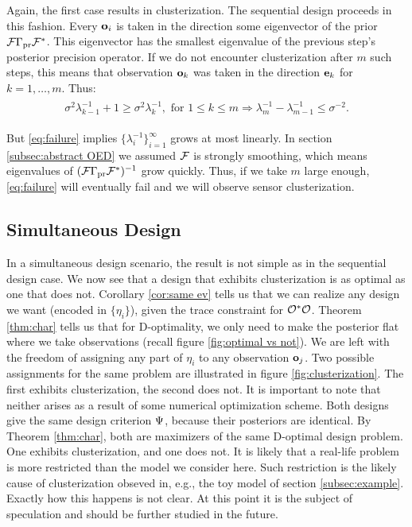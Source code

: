 \documentclass{amsart}
\numberwithin{equation}{section}
\begin{document}
Again, the first case results in clusterization. The sequential design
proceeds in this fashion. Every $\mathbf{o}_i$ is taken in the direction
some eigenvector of the prior $\mathcal{F} \Gamma_{\textup{pr}}\mathcal{F}^*$. This eigenvector
has the smallest eigenvalue of the previous step's posterior precision
operator. If we do not encounter clusterization after $m$ such steps,
this means that observation $\mathbf{o}_k$ was taken in the direction
$\mathbf{e}_k$ for $k=1,\dots,m$. Thus:
\begin{align}\label{eq:failure}
  \begin{split}
    \sigma^2\lambda_{k-1}^{-1} + 1 \geq \sigma^2\lambda_k^{-1}, \text{ for } 1\leq k \leq m
    \Longrightarrow \lambda_m^{-1} - \lambda_{m-1}^{-1} \leq \sigma^{-2}.
  \end{split}
\end{align}

But \eqref{eq:failure} implies $\{\lambda_i^{-1}\}_{i=1}^{\infty}$
grows at most linearly. In section \ref{subsec:abstract OED} we
assumed $\mathcal{F}$ is strongly smoothing, which means eigenvalues of
$(\mathcal{F} \Gamma_{\textup{pr}}\mathcal{F}^*)^{-1}$ grow quickly. Thus, if we take $m$ large
enough, \eqref{eq:failure} will eventually fail and we will observe
sensor clusterization.


\subsection{Simultaneous Design}\label{subsec:clusterization simultaneous}
In a simultaneous design scenario, the result is not simple as in the
sequential design case. We now see that a design that exhibits
clusterization is as optimal as one that does not. Corollary
\ref{cor:same ev} tells us that we can realize any design we want
(encoded in $\{\eta_i\}$), given the trace constraint for
$\mathcal{O}^*\mathcal{O}$. Theorem \ref{thm:char} tells us that for D-optimality,
we only need to make the posterior flat where we take observations
(recall figure \ref{fig:optimal vs not}). We are left with the freedom
of assigning any part of $\eta_i$ to any observation $\mathbf{o}_j$. Two
possible assignments for the same problem are illustrated in figure
\ref{fig:clusterization}. The first exhibits clusterization, the
second does not. It is important to note that neither arises as a
result of some numerical optimization scheme. Both designs give the
same design criterion $\Psi$, because their posteriors are
identical. By Theorem \ref{thm:char}, both are maximizers of the same
D-optimal design problem. One exhibits clusterization, and one does
not. It is likely that a real-life problem is more restricted than the
model we consider here. Such restriction is the likely cause of
clusterization obseved in, e.g., the toy model of section
\ref{subsec:example}. Exactly how this happens is not clear. At this
point it is the subject of speculation and should be further studied
in the future.
\end{document}
